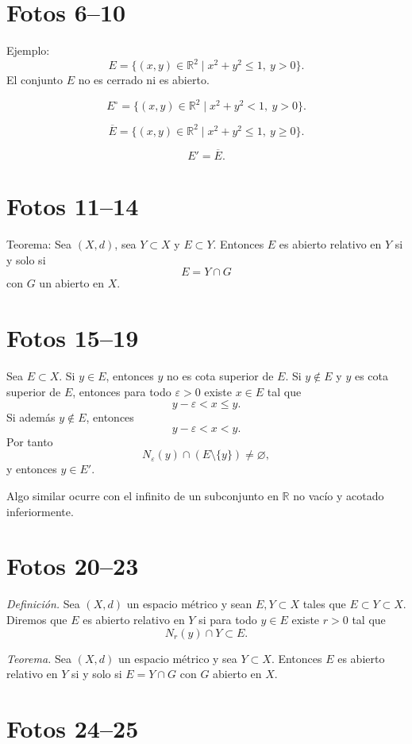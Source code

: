 \documentclass[12pt]{article}
\begin{document}
\section*{Fotos 6--10}

Ejemplo:
\[
E=\{(x,y)\in\mathbb R^2\mid x^2+y^2\le 1,\ y>0\}.
\]
El conjunto $E$ no es cerrado ni es abierto.

\[
E^\circ=\{(x,y)\in\mathbb R^2\mid x^2+y^2<1,\ y>0\}.
\]

\[
\overline E=\{(x,y)\in\mathbb R^2\mid x^2+y^2\le 1,\ y\ge 0\}.
\]

\[
E'=\overline E.
\]

\section*{Fotos 11--14}

Teorema: Sea $(X,d)$, sea $Y\subset X$ y $E\subset Y$.
Entonces $E$ es abierto relativo en $Y$ si y solo si
\[
E=Y\cap G
\]
con $G$ un abierto en $X$.

\section*{Fotos 15--19}

Sea $E\subset X$.
Si $y\in E$, entonces $y$ no es cota superior de $E$.
Si $y\notin E$ y $y$ es cota superior de $E$, entonces para todo $\varepsilon>0$ existe $x\in E$ tal que
\[
y-\varepsilon<x\le y.
\]
Si además $y\notin E$, entonces
\[
y-\varepsilon<x<y.
\]
Por tanto
\[
N_\varepsilon(y)\cap(E\setminus\{y\})\neq\varnothing,
\]
y entonces $y\in E'$.

Algo similar ocurre con el infinito de un subconjunto en $\mathbb R$ no vacío y acotado inferiormente.

\section*{Fotos 20--23}

\textit{Definición.} Sea $(X,d)$ un espacio métrico y sean $E,Y\subset X$ tales que $E\subset Y\subset X$.
Diremos que $E$ es abierto relativo en $Y$ si para todo $y\in E$ existe $r>0$ tal que
\[
N_r(y)\cap Y\subset E.
\]

\textit{Teorema.} Sea $(X,d)$ un espacio métrico y sea $Y\subset X$.
Entonces $E$ es abierto relativo en $Y$ si y solo si $E=Y\cap G$ con $G$ abierto en $X$.

\section*{Fotos 24--25}
\end{document}
